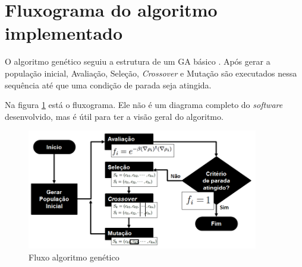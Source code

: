 \section{Fluxograma do algoritmo implementado}

	O algoritmo genético seguiu a estrutura de um GA básico \cite{Mitchell98, Linden2008}. Após gerar a população inicial, Avaliação, Seleção, \emph{Crossover} e Mutação são executados nessa sequência até que uma condição de parada seja atingida.
	
	Na figura \ref{fig:fluxo} está o fluxograma. Ele não é um diagrama completo do \emph{software} desenvolvido, mas é útil para ter a visão geral do algoritmo.

\begin{figure}[htbp]
	\centering
		\includegraphics[width=0.90\textwidth]{figs/materiais_metodo/autovalores_com_ga/fluxo.png}
	\caption{Fluxo algoritmo genético}
	\label{fig:fluxo}
\end{figure}